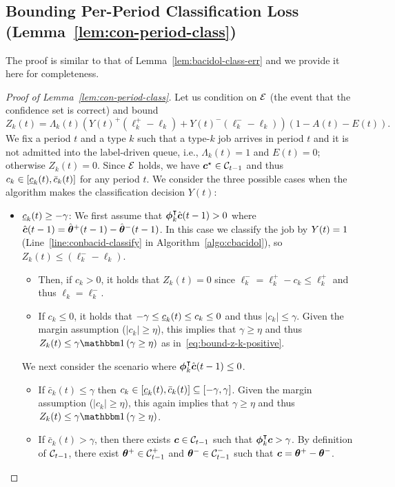 \subsection{Bounding Per-Period Classification Loss (Lemma~\ref{lem:con-period-class})}\label{app:lem-con-period-class}
The proof is similar to that of Lemma~\ref{lem:bacidol-class-err} and we provide it here for completeness.
\begin{proof}[Proof of Lemma~\ref{lem:con-period-class}]
 Let us condition on $\mathcal{E}$ (the event that the confidence set is correct) and bound 
 \[
 Z_k(t) = \Lambda_k(t)(Y(t)^+(\ell_k^+ - \ell_k) + Y(t)^-(\ell_k^- -\ell_k))(1-A(t)-E(t)).
 \]
 We fix a period $t$ and a type $k$ such that a type-$k$ job arrives in period $t$ and it is not admitted into the label-driven queue, i.e., $\Lambda_k(t) = 1$ and $E(t) = 0$; otherwise $Z_k(t) = 0$. Since $\mathcal{E}$ holds, we have $\boldsymbol{c}^\star \in \mathcal{C}_{t-1}$ and thus $c_k \in [\underline{c}_k(t),\bar{c}_k(t)]$ for any period $t$. We consider the three possible cases when the algorithm makes the classification decision $Y(t)$:
\begin{itemize}
\item $\underline{c}_k(t) \geq -\gamma$: We first assume that $\boldsymbol{\phi}_k^{\intercal}\hat{\boldsymbol{c}}(t-1) > 0$ where $\hat{\boldsymbol{c}}(t-1) = \hat{\boldsymbol{\theta}}^+(t-1) - \hat{\boldsymbol{\theta}}^-(t-1)$. In this case we classify the job by $Y(t) = \-1$ (Line~\ref{line:conbacid-classify} in Algorithm~\ref{algo:cbacidol}), so $Z_k(t) \leq (\ell_k^- - \ell_k)$. 
\begin{itemize}
    \item Then, if $c_k > 0$, it holds that $Z_k(t) = 0$ since $\ell_k^- = \ell_k^+ - c_k \leq \ell_k^+$ and thus $\ell_k = \ell_k^-$.
    \item If $c_k \leq 0$, it holds that $-\gamma \leq \underline{c}_k(t) \leq c_k \leq 0$ and thus $|c_k|\leq \gamma$. Given the margin assumption ($|c_k|\geq \eta$), this implies that $\gamma\geq \eta$ and thus $Z_k(t) \leq \gamma \indic{\gamma \geq \eta}$ as in~\eqref{eq:bound-z-k-positive}. 
\end{itemize}
We next consider the scenario where  $\boldsymbol{\phi}_k^{\intercal}\hat{\boldsymbol{c}}(t-1)\leq 0$. 
\begin{itemize}
    \item If $\bar{c}_k(t) \leq \gamma$ then $c_k \in [\underline{c}_k(t),\bar{c}_k(t)] \subseteq [-\gamma,\gamma]$. Given the margin assumption  ($|c_k|\geq \eta$), this again implies that $\gamma\geq \eta$ and thus  $Z_k(t) \leq \gamma\indic{\gamma \geq \eta}$.
    \item If $\bar{c}_k(t) > \gamma$, then there exists $\boldsymbol{c} \in \mathcal{C}_{t-1}$ such that $\boldsymbol{\phi}_k^{\intercal}\boldsymbol{c} > \gamma$. By definition of $\mathcal{C}_{t-1}$, there exist $\boldsymbol{\theta}^+ \in \mathcal{C}^+_{t-1}$ and $\boldsymbol{\theta}^- \in \mathcal{C}^-_{t-1}$ such that $\boldsymbol{c} = \boldsymbol{\theta}^+ - \boldsymbol{\theta}^-$. 

\end{itemize}
\end{itemize}
\end{proof}
